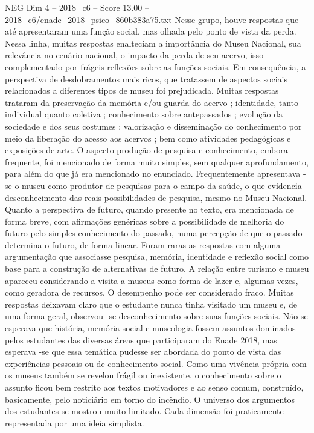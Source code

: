 \begin{textsample}{NEG Dim 4 – 2018\_c6 – Score 13.00 – 2018\_c6/enade\_2018\_psico\_860b383a75.txt}
Nesse grupo, houve respostas que até apresentaram uma função social, mas olhada pelo ponto de vista da perda.
Nessa linha, muitas respostas enalteciam a importância do Museu Nacional, sua relevância no cenário nacional, o impacto da perda de seu acervo, isso complementado por frágeis reflexões sobre as funções sociais.
Em consequência, a perspectiva de desdobramentos mais ricos, que tratassem de aspectos sociais relacionados a diferentes tipos de museu foi prejudicada.
Muitas respostas trataram da preservação da memória e/ou guarda do acervo ; identidade, tanto individual quanto coletiva ; conhecimento sobre antepassados ; evolução da sociedade e dos seus costumes ; valorização e disseminação do conhecimento por meio da liberação do acesso aos acervos ; bem como atividades pedagógicas e exposições de arte.
O aspecto produção de pesquisa e conhecimento, embora frequente, foi mencionado de forma muito simples, sem qualquer aprofundamento, para além do que já era mencionado no enunciado.
Frequentemente apresentava -se o museu como produtor de pesquisas para o campo da saúde, o que evidencia desconhecimento das reais possibilidades de pesquisa, mesmo no Museu Nacional.
Quanto a perspectiva de futuro, quando presente no texto, era mencionada de forma breve, com afirmações genéricas sobre a possibilidade de melhoria do futuro pelo simples conhecimento do passado, numa percepção de que o passado determina o futuro, de forma linear.
Foram raras as respostas com alguma argumentação que associasse pesquisa, memória, identidade e reflexão social como base para a construção de alternativas de futuro.
A relação entre turismo e museu apareceu considerando a visita a museus como forma de lazer e, algumas vezes, como geradora de recursos.
O desempenho pode ser considerado fraco.
Muitas respostas deixavam claro que o estudante nunca tinha visitado um museu e, de uma forma geral, observou -se desconhecimento sobre suas funções sociais.
Não se esperava que história, memória social e museologia fossem assuntos dominados pelos estudantes das diversas áreas que participaram do Enade 2018, mas esperava -se que essa temática pudesse ser abordada do ponto de vista das experiências pessoais ou de conhecimento social.
Como uma vivência própria com os museus também se revelou frágil ou inexistente, o conhecimento sobre o assunto ficou bem restrito aos textos motivadores e ao senso comum, construído, basicamente, pelo noticiário em torno do incêndio.
O universo dos argumentos dos estudantes se mostrou muito limitado.
Cada dimensão foi praticamente representada por uma ideia simplista.

\end{textsample}
